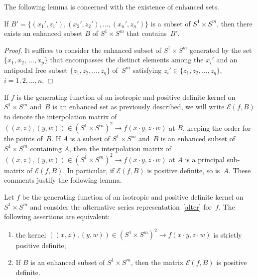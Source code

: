 The following lemma is concerned with the existence of enhanced sets.

\begin{Lemma} \label{key1Lemma} If $B'=\{(x_1',z_1'),(x_2',z_2'), \ldots, (x_n',z_n')\}$ is a subset of $S^1 \times S^m$, then there exists an enhanced subset $B$ of $S^1 \times S^m$ that contains~$B'$.
\end{Lemma}
\begin{proof}
It suf\/f\/ices to consider the enhanced subset of $S^1 \times S^m$ generated by the set $\{x_1,x_2$, $\ldots, x_p\}$ that encompasses the distinct elements among the $x_i'$ and an antipodal free subset $\{z_1,z_2, \ldots, z_q\}$ of~$S^m$ satisfying $z_i' \in \{z_1,z_2, \ldots, z_q\}$, $i=1,2,\ldots,n$.
\end{proof}

If $f$ is the generating function of an isotropic and positive def\/inite kernel on $S^1 \times S^m$ and~$B$ is an enhanced set as previously described, we will write $\mathcal{E}(f,B)$ to denote the interpolation matrix of $((x,z), (y,w)) \in (S^1 \times S^m)^2 \to f(x \cdot y, z \cdot w)$ at $B$, keeping the order for the points of~$B$. If $A$ is a subset of $S^1 \times S^m$ and~$B$ is an enhanced subset of $S^1 \times S^m$ containing $A$, then the interpolation matrix of $((x,z), (y,w)) \in (S^1 \times S^m)^2 \to f(x \cdot y, z \cdot w)$ at $A$ is a principal sub-matrix of $\mathcal{E}(f,B)$. In particular, if $\mathcal{E}(f,B)$ is positive def\/inite, so is~$A$. These comments justify the following lemma.

\begin{Lemma}\label{augmentation}
Let $f$ be the generating function of an isotropic and positive definite kernel on~\mbox{$S^1 \times S^m$} and consider the alternative series representation~\eqref{alter} for~$f$. The following assertions are equivalent:
\begin{enumerate}\itemsep=0pt
\item[$(i)$] the kernel $((x,z), (y,w)) \in (S^1 \times S^m)^2 \to f(x \cdot y, z \cdot w)$ is strictly positive definite;
\item[$(ii)$] If $B$ is an enhanced subset of $S^1 \times S^m$, then the matrix $\mathcal{E}(f,B)$ is positive definite.
\end{enumerate}
\end{Lemma}

